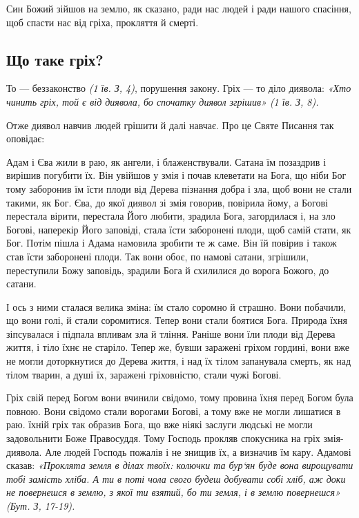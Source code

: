 \documentclass[main.tex]{subfiles}
\begin{document}
Син Божий зійшов на землю, як сказано, ради нас людей і ради нашого спасіння, щоб спасти нас від гріха, прокляття й смерті.

\subsection{Що таке гріх?}

То — беззаконство \emph{(1 їв. З, 4)}, порушення закону. Гріх — то діло диявола: \emph{{\color{red} «Хто чинить гріх, той є від диявола, бо спочатку диявол згрішив»} (1 їв. З, 8).}

Отже диявол навчив людей грішити й далі навчає. Про це Святе Писання так оповідає:

Адам і Єва жили в раю, як ангели, і блаженствували. Сатана їм позаздрив і вирішив погубити їх. Він увійшов у змія і почав клеветати на Бога, що ніби Бог тому заборонив їм їсти плоди від Дерева пізнання добра і зла, щоб вони не стали такими, як Бог. Єва, до якої диявол зі змія говорив, повірила йому, а Богові перестала вірити, перестала Його любити, зрадила Бога, загордилася і, на зло Богові, наперекір Його заповіді, стала їсти заборонені плоди, щоб самій стати, як Бог. Потім пішла і Адама намовила зробити те ж саме. Він їй повірив і також став їсти заборонені плоди. Так вони обоє, по намові сатани, згрішили, переступили Божу заповідь, зрадили Бога й схилилися до ворога Божого, до сатани.

І ось з ними сталася велика зміна: їм стало соромно й страшно. Вони побачили, що вони голі, й стали соромитися. Тепер вони стали боятися Бога. Природа їхня зіпсувалася і підпала впливам зла й тління. Раніше вони їли плоди від Дерева життя, і тіло їхнє не старіло. Тепер же, бувши заражені гріхом гордині, вони вже не могли доторкнутися до Дерева життя, і над їх тілом запанувала смерть, як над тілом тварин, а душі їх, заражені гріховністю, стали чужі Богові.

Гріх свій перед Богом вони вчинили свідомо, тому провина їхня перед Богом була повною. Вони свідомо стали ворогами Богові, а тому вже не могли лишатися в раю. їхній гріх так образив Бога, що вже ніякі заслуги людські не могли задовольнити Боже Правосуддя. Тому Господь прокляв спокусника на гріх змія-диявола. Але людей Господь пожалів і не знищив їх, а визначив їм кару. Адамові сказав: \emph{{\color{red} «Проклята земля в ділах твоїх: колючки та бур`ян буде вона вирощувати тобі замість хліба. А ти в поті чола свого будеш добувати собі хліб, аж доки не повернешся в землю, з якої ти взятий, бо ти земля, і в землю повернешся»} (Бут. З, 17-19).}
\end{document}
